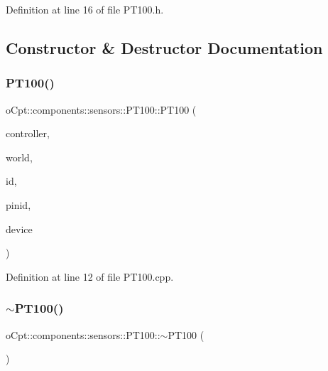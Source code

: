 Definition at line 16 of file P\+T100.\+h.



\subsection{Constructor \& Destructor Documentation}
\hypertarget{classo_cpt_1_1components_1_1sensors_1_1_p_t100_aedb71224bcffefd6d43ee72458344826}{}\label{classo_cpt_1_1components_1_1sensors_1_1_p_t100_aedb71224bcffefd6d43ee72458344826} 
\subsubsection{\texorpdfstring{P\+T100()}{PT100()}}
{\footnotesize\ttfamily o\+Cpt\+::components\+::sensors\+::\+P\+T100\+::\+P\+T100 (\begin{DoxyParamCaption}\item[{\hyperlink{classo_cpt_1_1i_controller_a6d89a95cd6ad68bb74adfaca2f36370f}{i\+Controller\+::ptr}}]{controller,  }\item[{\hyperlink{classo_cpt_1_1_world_aa6e591e3096d5de71e0cec9039663d67}{World\+::ptr}}]{world,  }\item[{std\+::string}]{id,  }\item[{uint8\+\_\+t}]{pinid,  }\item[{uint8\+\_\+t}]{device }\end{DoxyParamCaption})}



Definition at line 12 of file P\+T100.\+cpp.

\hypertarget{classo_cpt_1_1components_1_1sensors_1_1_p_t100_aa6fcce0276d47e75a16f153962c57b8c}{}\label{classo_cpt_1_1components_1_1sensors_1_1_p_t100_aa6fcce0276d47e75a16f153962c57b8c} 
\subsubsection{\texorpdfstring{$\sim$\+P\+T100()}{~PT100()}}
{\footnotesize\ttfamily o\+Cpt\+::components\+::sensors\+::\+P\+T100\+::$\sim$\+P\+T100 (\begin{DoxyParamCaption}{ }\end{DoxyParamCaption})}



